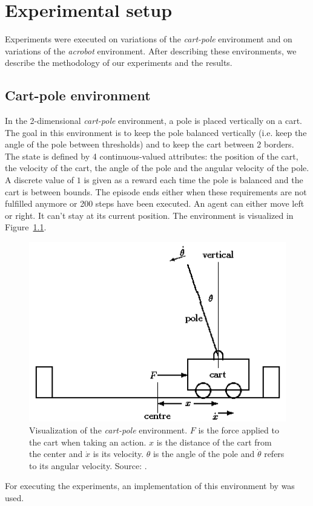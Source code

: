 \chapter{Experimental setup}
Experiments were executed on variations of the \textit{cart-pole} environment and on variations of the \textit{acrobot} environment. After describing these environments, we describe the methodology of our experiments and the results.\\

\section{Cart-pole environment} %
\label{sub:cartpole_environment}
In the 2-dimensional \textit{cart-pole} environment, a pole is placed vertically on a cart.
The goal in this environment is to keep the pole balanced vertically (i.e. keep the angle of the pole between thresholds) and to keep the cart between 2 borders.
The state is defined by 4 continuous-valued attributes: the position of the cart, the velocity of the cart, the angle of the pole and the angular velocity of the pole.
A discrete value of $1$ is given as a reward each time the pole is balanced and the cart is between bounds.
The episode ends either when these requirements are not fulfilled anymore or 200 steps have been executed.
An agent can either move left or right. It can't stay at its current position.
The environment is visualized in Figure~\ref{fig:cartpole}.
\begin{figure}[htb]
    \centering
    \includegraphics[width=.6\linewidth]{images/cartpole.png}
    \caption[Visualization of the \emph{cart-pole} environment]{Visualization of the \emph{cart-pole} environment. $F$ is the force applied to the cart when taking an action. $x$ is the distance of the cart from the center and $\dot{x}$ is its velocity. $\theta$ is the angle of the pole and $\dot{\theta}$ refers to its angular velocity. Source: \cite{grant1990modelling}.}
    \label{fig:cartpole}
\end{figure}
For executing the experiments, an implementation of this environment by \cite{Brockman2016OpenAIGym} was used.\\

